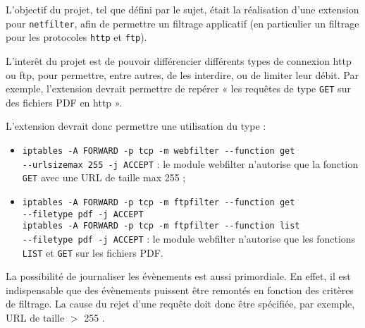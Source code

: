 L'objectif du projet, tel que défini par le sujet, était la réalisation d'une extension
pour \verb+netfilter+, afin de permettre un filtrage applicatif (en particulier un filtrage
pour les protocoles \verb+http+ et \verb+ftp+).

L'interêt du projet est de pouvoir différencier différents types de connexion http ou ftp,
pour permettre, entre autres, de les interdire, ou de limiter leur débit. Par exemple, l'extension
devrait permettre de repérer « les requêtes de type \verb+GET+ sur des fichiers PDF en http ».

L'extension devrait donc permettre une utilisation du type :
\begin{itemize}
\item \verb+iptables -A FORWARD -p tcp -m webfilter --function get+\\ \verb+--urlsizemax 255 -j ACCEPT+ : le module \og webfilter \fg{} n'autorise que la fonction \verb+GET+ avec une URL de taille max 255 ;
\item \verb+iptables -A FORWARD -p tcp -m ftpfilter --function get+\\
\verb+--filetype pdf -j ACCEPT+\\
\verb+iptables -A FORWARD -p tcp -m ftpfilter --function list+\\
\verb+--filetype pdf -j ACCEPT+ : le module \og webfilter \fg{} n'autorise que les fonctions \verb+LIST+ et \verb+GET+ sur les fichiers PDF.
\end{itemize}

La possibilité de journaliser les évènements est aussi primordiale. En effet, il est indispensable que des évènements puissent être remontés en fonction des critères de filtrage. La cause du rejet d'une requête doit donc être spécifiée, par exemple, \og URL de taille $>$ 255 \fg{}.
